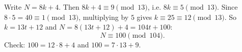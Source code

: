Write $N=8k+4$. Then $8k+4\equiv9\pmod{13}$, i.e. $8k\equiv5\pmod{13}$. Since $8\cdot5=40\equiv1\pmod{13}$, multiplying by $5$ gives $k\equiv25\equiv12\pmod{13}$. So $k=13t+12$ and $N=8(13t+12)+4=104t+100$:
\[\boxed{N\equiv100\pmod{104}}.\]
Check: $100=12\cdot8+4$ and $100=7\cdot13+9$.
